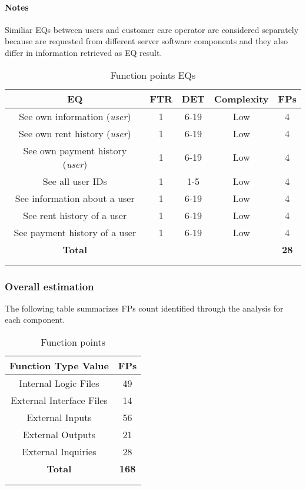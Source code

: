 \paragraph{Notes} Similiar EQs between users and customer care operator are considered separately because are requested from different server software components and they also differ in information retrieved as EQ result. \\

\begin{longtable}{ccccc}
\toprule
\textbf{EQ}	& FTR & DET & 	Complexity  & \textbf{FPs}\\
\midrule
See own information (\emph{user}) & 1 & 6-19 & Low & 4\\
See own rent history (\emph{user}) & 1 & 6-19 & Low & 4\\
See own payment history (\emph{user}) & 1 & 6-19 & Low & 4\\
See all user IDs & 1 & 1-5 & Low & 4\\
See information about a user & 1 & 6-19 & Low & 4\\
See rent history of a user & 1 & 6-19 & Low & 4\\
See payment history of a user & 1 & 6-19 & Low & 4\\
\midrule
\textbf{Total} & & & &  \textbf{28}\\
\bottomrule \\
\caption{Function points EQs}
\label{tbl:eqFP}
\end{longtable}

\clearpage 

\subsubsection{Overall estimation}

The following table summarizes FPs count identified through the analysis for each component.\\
\begin{longtable}{cc}
\toprule
\textbf{Function Type Value}  & \textbf{FPs}\\
\midrule
Internal Logic Files & 49 \\
External Interface Files & 14 \\
External Inputs & 56 \\
External Outputs &  21\\
External Inquiries & 28 \\
\midrule
\textbf{Total} & \textbf{168}\\
\bottomrule \\
\caption{Function points}
\label{tbl:FP}
\end{longtable}

